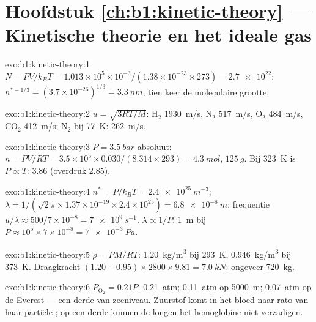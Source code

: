 \section*{Hoofdstuk \ref{ch:b1:kinetic-theory} --- Kinetische theorie en het ideale gas}

\begin{solution}{exo:b1:kinetic-theory:1}
$N = PV/k_BT = 1.013\times10^5 \times 10^{-3}/(1.38\times10^{-23} \times 273) =
\num{2.7e22}$; $n^{*-1/3} = (3.7\times10^{-26})^{1/3} = \qty{3.3}{nm}$, tien
keer de moleculaire grootte.
\end{solution}

\begin{solution}{exo:b1:kinetic-theory:2}
$u = \sqrt{3RT/M}$: H$_2$ \qty{1930}{m/s}, N$_2$ \qty{517}{m/s}, O$_2$
\qty{484}{m/s}, CO$_2$ \qty{412}{m/s}; N$_2$ bij \qty{77}{K}: \qty{262}{m/s}.
\end{solution}

\begin{solution}{exo:b1:kinetic-theory:3}
$P = \qty{3.5}{bar}$ absoluut: $n = PV/RT = 3.5\times10^5 \times 0.030/(8.314
\times 293) = \qty{4.3}{mol}$, $\qty{125}{g}$. Bij \qty{323}{K} is $P \propto T$:
\qty{3.86}{} (overdruk \qty{2.85}{}).
\end{solution}

\begin{solution}{exo:b1:kinetic-theory:4}
$n^* = P/k_BT = \qty{2.4e25}{m^{-3}}$; $\lambda = 1/(\sqrt2\pi \times 1.37\times
10^{-19} \times 2.4\times10^{25}) = \qty{6.8e-8}{m}$; frequentie $u/\lambda \approx
500/7\times10^{-8} = \qty{7e9}{s^{-1}}$. $\lambda \propto 1/P$: \qty{1}{m} bij
$P \approx 10^5 \times 7\times10^{-8} = \qty{7e-3}{Pa}$.
\end{solution}

\begin{solution}{exo:b1:kinetic-theory:5}
$\rho = PM/RT$: \qty{1.20}{kg/m^3} bij \qty{293}{K}, \qty{0.946}{kg/m^3} bij
\qty{373}{K}. Draagkracht $(1.20 - 0.95) \times 2800 \times 9.81 = \qty{7.0}{kN}$:
ongeveer \qty{720}{kg}.
\end{solution}

\begin{solution}{exo:b1:kinetic-theory:6}
$P_{\mathrm{O}_2} = 0.21P$: \qty{0.21}{atm}; \qty{0.11}{atm} op \qty{5000}{m};
\qty{0.07}{atm} op de Everest --- een derde van zeeniveau. Zuurstof komt in het
bloed naar rato van haar partiële ; op een derde kunnen de longen
het hemoglobine niet verzadigen.
\end{solution}

